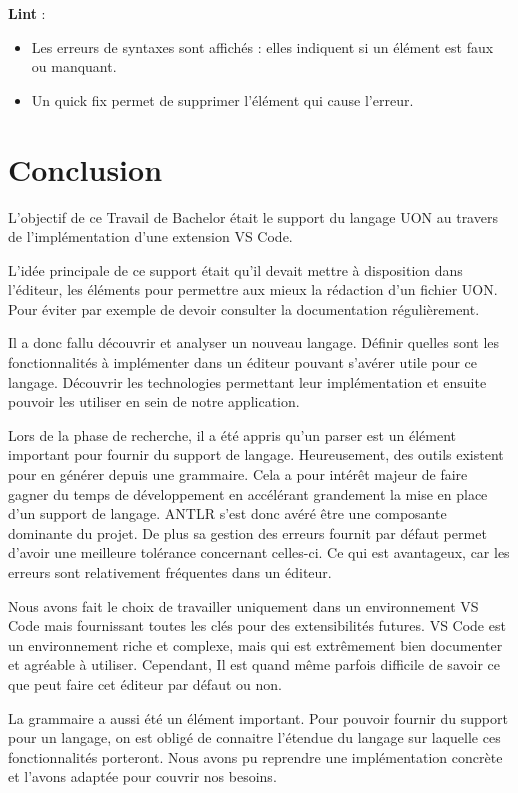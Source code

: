 \documentclass[
    iict, %
    il, %
]{heig-tb}
\begin{document}
\textbf{Lint} :
\begin{itemize}
    \item Les erreurs de syntaxes sont affichés : elles indiquent si un élément est faux ou manquant.
    \item Un quick fix permet de supprimer l'élément qui cause l'erreur.
\end{itemize}

\chapter{Conclusion}

L'objectif de ce Travail de Bachelor était le support du langage UON au travers de l'implémentation d'une extension VS Code.

L'idée principale de ce support était qu'il devait mettre à disposition dans l'éditeur, les éléments pour permettre aux mieux la rédaction d'un fichier UON.
Pour éviter par exemple de devoir consulter la documentation régulièrement.

Il a donc fallu découvrir et analyser un nouveau langage.
Définir quelles sont les fonctionnalités à implémenter dans un éditeur pouvant s'avérer utile pour ce langage.
Découvrir les technologies permettant leur implémentation et ensuite pouvoir les utiliser en sein de notre application.

Lors de la phase de recherche, il a été appris qu'un parser est un élément important pour fournir du support de langage.
Heureusement, des outils existent pour en générer depuis une grammaire. Cela a pour intérêt majeur de faire gagner du temps de développement en accélérant grandement la mise en place d'un support de langage.
ANTLR s'est donc avéré être une composante dominante du projet. De plus sa gestion des erreurs fournit par défaut permet d'avoir une meilleure tolérance concernant celles-ci.
Ce qui est avantageux, car les erreurs sont relativement fréquentes dans un éditeur.

Nous avons fait le choix de travailler uniquement dans un environnement VS Code mais fournissant toutes les clés pour des extensibilités futures.
VS Code est un environnement riche et complexe, mais qui est extrêmement bien documenter et agréable à utiliser.
Cependant, Il est quand même parfois difficile de savoir ce que peut faire cet éditeur par défaut ou non.

La grammaire a aussi été un élément important.
Pour pouvoir fournir du support pour un langage, on est obligé de connaitre l'étendue du langage sur laquelle ces fonctionnalités porteront.
Nous avons pu reprendre une implémentation concrète et l'avons adaptée pour couvrir nos besoins.
\end{document}
